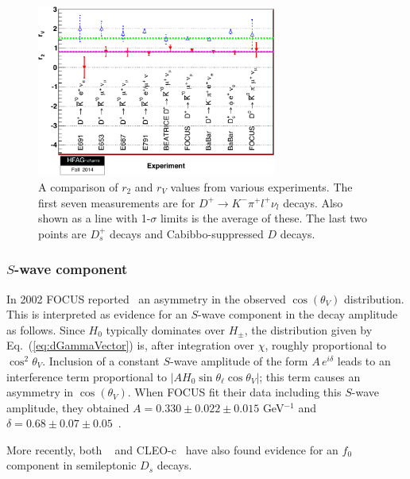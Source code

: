 \begin{figure}[htbp]
  \begin{center}
    \includegraphics[width=0.7\textwidth]{figures/charm/sl_r2rv_hfag.pdf}
  \end{center}
\vskip0.10in
  \caption{A comparison of $r_2$ and $r_V$ values 
    from various experiments. The first seven measurements are for $D^+
    \to K^-\pi^+ l^+\nu_l$ decays. Also shown as a line with
    1-$\sigma$ limits is the average of these. The last two points are
    $D_s^+$ decays and Cabibbo-suppressed $D$ decays.  
  \label{fig:r2rv}}
\end{figure}

\subsubsection{$S$-wave component}

In 2002 FOCUS reported~\cite{Link:2002ev} an asymmetry in
the observed $\cos(\theta_V)$ distribution. This is interpreted as
evidence for an $S$-wave component in the decay amplitude as follows. 
Since $H_0$ typically dominates over $H_{\pm}$, the distribution given 
by Eq.~(\ref{eq:dGammaVector}) is, after integration over $\chi$,
roughly proportional to $\cos^2\theta_V$. 
Inclusion of a constant $S$-wave amplitude of the form $A\,e^{i\delta}$ 
leads to an interference term proportional to 
$|A H_0 \sin\theta_\ell \cos\theta_V|$; this term causes an asymmetry 
in $\cos(\theta_V)$.
When FOCUS fit their data including this $S$-wave amplitude, 
they obtained $A = 0.330 \pm 0.022 \pm 0.015$ GeV$^{-1}$ and 
$\delta = 0.68 \pm 0.07 \pm 0.05$~\cite{Link:2002wg}. 

More recently, both \babar~\cite{Aubert:2008rs} and 
CLEO-c~\cite{Ecklund:2009fia} have also found evidence 
for an $f^{}_0$ component in semileptonic $D^{}_s$ decays.



